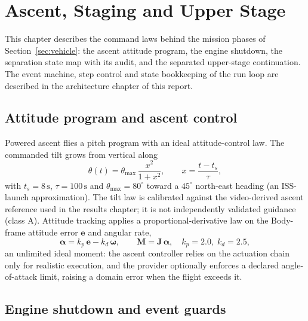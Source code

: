 \section{Ascent, Staging and Upper Stage}
\label{sec:ascent}

This chapter describes the command laws behind the mission phases of
Section~\ref{sec:vehicle}: the ascent attitude program, the engine
shutdown, the separation state map with its audit, and the separated
upper-stage continuation. The event machine, step control and state bookkeeping of the run loop are
described in the architecture chapter of this report.

\subsection{Attitude program and ascent control}

Powered ascent flies a pitch program with an ideal attitude-control law.
The commanded tilt grows from vertical along
%
\begin{equation}
\label{eq:pitch-program}
\theta(t) = \theta_{\max}\,
\frac{x^2}{1+x^2},
\qquad x = \frac{t - t_s}{\tau},
\end{equation}
%
with $t_s = 8\,\mathrm{s}$, $\tau = 100\,\mathrm{s}$ and
$\theta_{\max} = 80^{\circ}$ toward a $45^{\circ}$ north-east heading (an
\ac{ISS}-launch approximation). The tilt law is calibrated against the
video-derived ascent reference used in the results chapter; it is not
independently validated guidance (class A). Attitude tracking applies a
proportional-derivative law on the Body-frame attitude error
$\mathbf{e}$ and angular rate,
%
\begin{equation}
\label{eq:attitude-pd}
\boldsymbol{\alpha} = k_p\,\mathbf{e} - k_d\,\boldsymbol{\omega},
\qquad
\mathbf{M} = \mathbf{J}\,\boldsymbol{\alpha},
\quad k_p = 2.0,\; k_d = 2.5,
\end{equation}
%
an unlimited ideal moment: the ascent controller relies on the
actuation chain only for realistic execution, and the provider optionally
enforces a declared angle-of-attack limit, raising a domain error when the
flight exceeds it.

\subsection{Engine shutdown and event guards}

